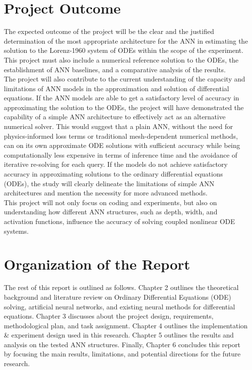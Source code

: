 \section{Project Outcome}
The expected outcome of the project will be the clear and the justified 
determination of the most appropriate architecture for the ANN in estimating 
the solution to the Lorenz-1960 system of ODEs within the scope of the experiment. This project must also include a 
numerical reference solution to the ODEs, the establishment of ANN 
baselines, and a comparative analysis of the results. \\[1pt]

The project will also contribute to the current understanding of the capacity
and limitations of ANN models in the approximation and solution of differential 
equations. If the ANN models are able to get a satisfactory level of accuracy in 
approximating the solution to the ODEs, the project will have demonstrated 
the capability of a simple ANN architecture to effectively act as an alternative 
numerical solver. This would suggest that a plain ANN, without the need for 
physics-informed loss terms or traditional mesh-dependent numerical 
methods, can on its own approximate ODE solutions with sufficient accuracy 
while being computationally less expensive in terms of inference time and the 
avoidance of iterative re-solving for each query. If the models do not achieve satisfactory accuracy in approximating solutions to the ordinary differential equations (ODEs), the study will clearly delineate the limitations of simple ANN architectures and mention the necessity for more advanced methods. \\[1pt]

This project will not only focus on coding and experiments, but also on understanding how different ANN structures, such as depth, width, and activation functions, influence the accuracy of solving coupled nonlinear ODE systems.



\section{Organization of the Report}
The rest of this report is outlined as follows. Chapter 2 outlines the theoretical 
background and literature review on Ordinary Differential Equations (ODE) 
solving, artificial neural networks, and existing neural methods for differential 
equations. Chapter 3 discusses about the project design, requirements, 
methodological plan, and task assignment. Chapter 4 outlines the 
implementation \& experiment design used in this research. Chapter 5 outlines 
the results and analysis on the tested ANN structures. Finally, Chapter 6 
concludes this report by focusing the main results, limitations, and potential 
directions for the future research. 
